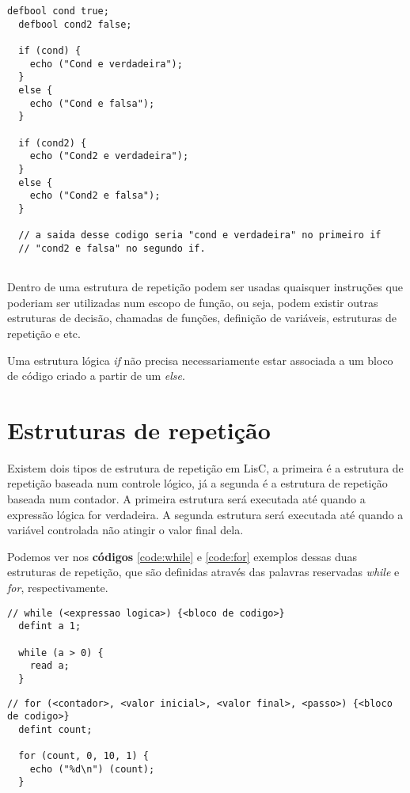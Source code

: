 \documentclass[
  12pt,				%
  oneside,			%
  a4paper,			%
  english,			%
  french,				%
  spanish,			%
  brazil,				%
]{abntex2}
\begin{document}
\begin{lstlisting}[label=code:ifelse,caption=Exemplo do uso de
  instruções de controles lógicos]
  defbool cond true;
  defbool cond2 false;

  if (cond) {
    echo ("Cond e verdadeira");
  }
  else {
    echo ("Cond e falsa");    
  }

  if (cond2) {
    echo ("Cond2 e verdadeira");        
  }
  else {
    echo ("Cond2 e falsa");        
  }

  // a saida desse codigo seria "cond e verdadeira" no primeiro if
  // "cond2 e falsa" no segundo if.
  
\end{lstlisting}

Dentro de uma estrutura de repetição podem ser usadas quaisquer
instruções que poderiam ser utilizadas num escopo de função, ou seja,
podem existir outras estruturas de decisão, chamadas de funções,
definição de variáveis, estruturas de repetição e etc.

Uma estrutura lógica \emph{if} não precisa necessariamente estar
associada a um bloco de código criado a partir de um \emph{else}.

\section{Estruturas de repetição}
\label{sec:estruturas-de-repeticao}

Existem dois tipos de estrutura de repetição em LisC, a primeira é a
estrutura de repetição baseada num controle lógico, já a segunda é a
estrutura de repetição baseada num contador. A primeira estrutura será
executada até quando a expressão lógica for verdadeira. A segunda
estrutura será executada até quando a variável controlada não atingir
o valor final dela.

Podemos ver nos \textbf{códigos} \ref{code:while} e \ref{code:for} 
exemplos dessas duas estruturas de repetição, que são definidas
através das palavras reservadas \emph{while} e \emph{for}, respectivamente.

\begin{lstlisting}[label=code:while,caption=Exemplo da estrutura de
  repetição while]
  // while (<expressao logica>) {<bloco de codigo>}
  defint a 1;

  while (a > 0) {
    read a;
  }

\end{lstlisting}

\begin{lstlisting}[label=code:for,caption=Exemplo da estrutura de
  repetição for]
  // for (<contador>, <valor inicial>, <valor final>, <passo>) {<bloco de codigo>}
  defint count;

  for (count, 0, 10, 1) {
    echo ("%d\n") (count);
  }
\end{lstlisting}
\end{document}
